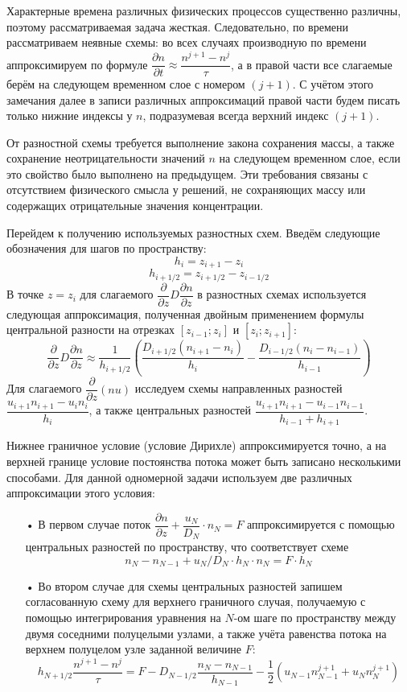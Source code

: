 \documentclass[14pt, a4paper, fleqn, twoside]{extreport}
\begin{document}
\medskip 

Характерные времена различных физических процессов существенно различны, поэтому рассматриваемая задача жесткая. Следовательно, по времени рассматриваем неявные схемы: во всех случаях производную по времени аппроксимируем по формуле $\dfrac{\partial n}{\partial t}\approx \dfrac{n^{j+1}-n^j}{\tau}$, а в правой части все слагаемые берём на следующем временном слое с номером $(j+1)$. С учётом этого замечания далее в записи различных аппроксимаций правой части будем писать только нижние индексы у $n$, подразумевая всегда верхний индекс $(j+1)$.

От разностной схемы требуется выполнение закона сохранения массы, а также сохранение неотрицательности значений $n$ на следующем временном слое, если это свойство было выполнено на предыдущем. Эти требования связаны с отсутствием физического смысла у решений, не сохраняющих массу или содержащих отрицательные значения концентрации.

Перейдем к получению используемых разностных схем. Введём следующие обозначения для шагов по пространству: $$h_i = z_{i+1}-z_i$$ $$h_{i+1/2}=z_{i+1/2}-z_{i-1/2}$$
В точке $z=z_i$ для слагаемого $\dfrac{\partial}{\partial z}D\dfrac{\partial n}{\partial z}$ в разностных схемах используется следующая аппроксимация, полученная двойным применением формулы центральной разности на отрезках $[z_{i-1};z_i]$ и $[z_i; z_{i+1}]$: 
$$\dfrac{\partial}{\partial z}D\dfrac{\partial n}{\partial z} \approx \dfrac{1}{h_{i+1/2}}\left(\dfrac{D_{i+1/2}(n_{i+1}-n_i)}{h_i}-\dfrac{D_{i-1/2}(n_{i}-n_{i-1})}{h_{i-1}}\right)$$
Для слагаемого $\dfrac{\partial}{\partial z}(nu)$ исследуем схемы направленных разностей $\dfrac{u_{i+1}n_{i+1}-u_{i}n_{i}}{h_i}$, а также центральных разностей $\dfrac{u_{i+1}n_{i+1}-u_{i-1}n_{i-1}}{h_{i-1}+h_{i+1}}$.

Нижнее граничное условие (условие Дирихле) аппроксимируется точно, а на верхней границе условие постоянства потока может быть записано несколькими способами. Для данной одномерной задачи используем две различных аппроксимации этого условия:

\begin{itemize}
\item[•] В первом случае поток $\dfrac{\partial n}{\partial z}+\dfrac{u_N}{D_N}\cdot n_N=F$ аппроксимируется с помощью центральных разностей по пространству, что соответствует схеме $$n_N-n_{N-1}+u_N/D_N\cdot h_N\cdot n_N = F\cdot h_N$$
\item[•] Во втором случае для схемы центральных разностей запишем согласованную схему для верхнего граничного случая, получаемую с помощью интегрирования уравнения на $N$-ом шаге по пространству между двумя соседними полуцелыми узлами, а также учёта равенства потока на верхнем полуцелом узле заданной величине $F$: $$h_{N+1/2}\dfrac{n^{j+1}-n^j}{\tau}= F - D_{N-1/2}\dfrac{n_N-n_{N-1}}{h_{N-1}}-\dfrac{1}{2}(u_{N-1}n_{N-1}^{j+1}+u_{N}n_{N}^{j+1})$$
\end{itemize}
\end{document}
